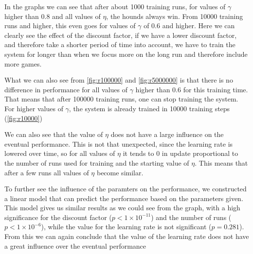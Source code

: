 In the graphs we can see that after about 1000 training runs, for values of
$\gamma$ higher than $0.8$ and all values of $\eta$, the hounds always win.
From 10000 training runs and higher, this even goes for values of $\gamma$
of $0.6$ and higher. Here we can clearly see the effect of the discount
factor, if we have a lower discount factor, and therefore take a shorter
period of time into account, we have to train the system for longer than
when we focus more on the long run and therefore include more games.

What we can also see from \autoref{fig:r100000} and \autoref{fig:r5000000}
is that there is no difference in performance for all values of $\gamma$
higher than $0.6$ for this training time. That means that after 100000
training runs, one can stop training the system. For higher values of
$\gamma$, the system is already trained in 10000 training steps
(\autoref{fig:r10000})

We can also see that the value of $\eta$ does not have a large influence on
the eventual performance. This is not that unexpected, since the learning
rate is lowered over time, so for all values of $\eta$ it tends to 0 in
update proportional to the number of runs used for training and the
starting value of $\eta$. This means that after a few runs all values of
$\eta$ become similar.

To further see the influence of the paramters on the performance, we
constructed a linear model that can predict the performance based on the
parameters given. This model gives us similar results as we could see from
the graph, with a high significance for the discount factor ($p < 1 \times
10 ^ {-11}$) and the number of runs ($p < 1 \times 10 ^ {-6}$), while the
value for the learning rate is not significant ($p = 0.281$). From this we
can again conclude that the value of the learning rate does not have a
great influence over the eventual performance

